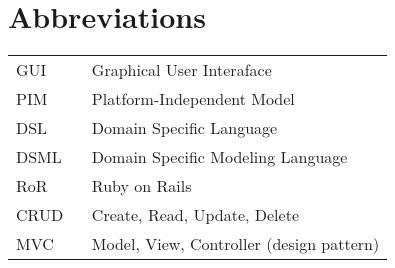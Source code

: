 \chapter*{Abbreviations}

\begin{flushleft}
\begin{tabular}{l p{0.8\linewidth}}
GUI       & Graphical User Interaface\\
PIM       & Platform-Independent Model\\
DSL       & Domain Specific Language\\
DSML      & Domain Specific Modeling Language\\
RoR       & Ruby on Rails\\
CRUD      & Create, Read, Update, Delete\\
MVC       & Model, View, Controller (design pattern)\\
\end{tabular}
\end{flushleft}

